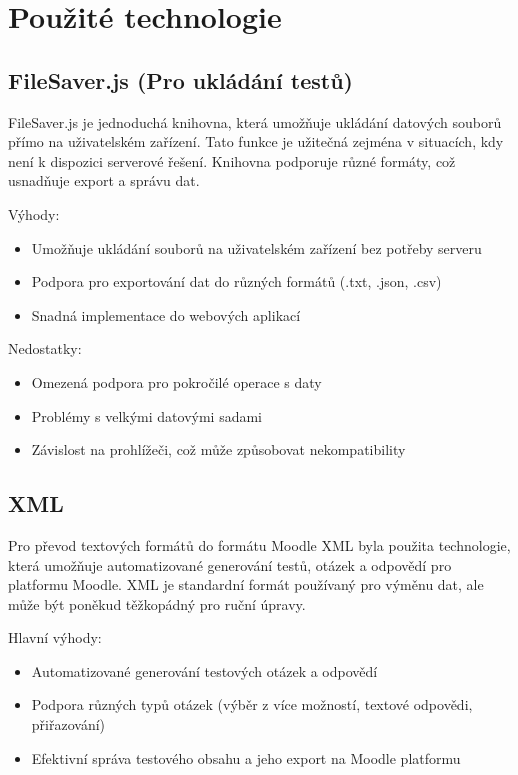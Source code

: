 \documentclass[12pt, a4paper, twoside, openright]{report}
\begin{document}
\chapter{Použité technologie}

\section{FileSaver.js (Pro ukládání testů)}
FileSaver.js je jednoduchá knihovna, která umožňuje ukládání datových souborů přímo na uživatelském zařízení. Tato funkce je užitečná zejména v situacích, kdy není k dispozici serverové řešení. Knihovna podporuje různé formáty, což usnadňuje export a správu dat.

Výhody: 
\begin{itemize}
    \item Umožňuje ukládání souborů na uživatelském zařízení bez potřeby serveru
    \item Podpora pro exportování dat do různých formátů (.txt, .json, .csv)
    \item Snadná implementace do webových aplikací
\end{itemize}

Nedostatky: 
\begin{itemize}
    \item Omezená podpora pro pokročilé operace s daty
    \item Problémy s velkými datovými sadami
    \item Závislost na prohlížeči, což může způsobovat nekompatibility
\end{itemize}

\section{XML}
Pro převod textových formátů do formátu Moodle XML byla použita technologie, která umožňuje automatizované generování testů, otázek a odpovědí pro platformu Moodle. XML je standardní formát používaný pro výměnu dat, ale může být poněkud těžkopádný pro ruční úpravy.

Hlavní výhody: 
\begin{itemize}
    \item Automatizované generování testových otázek a odpovědí
    \item Podpora různých typů otázek (výběr z více možností, textové odpovědi, přiřazování)
    \item Efektivní správa testového obsahu a jeho export na Moodle platformu
\end{itemize}
\end{document}
